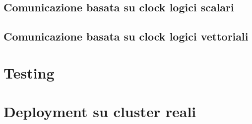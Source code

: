 \documentclass[conference]{IEEEtran}
\begin{document}
\subsection{Comunicazione basata su clock logici scalari}
\subsection{Comunicazione basata su clock logici vettoriali}

\section{Testing}
\section{Deployment su cluster reali}
\end{document}
